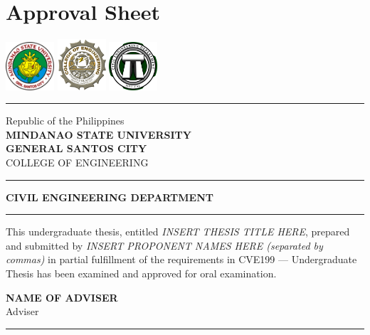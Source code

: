 \chapter*{Approval Sheet}
\thispagestyle{frontmatter}

{
	\vspace*{-1em}
	\begin{center}
		\includegraphics[width=1.8cm]{./assets/logo2.jpg}
		\hspace{1cm}
		\includegraphics[width=1.8cm]{./assets/logo3.jpg}
		\hspace{1cm}
		\includegraphics[width=1.8cm]{./assets/logo.png}
	\end{center}
	\hrule
	\begin{center}
		Republic of the Philippines\\
		{\bfseries MINDANAO STATE UNIVERSITY\\GENERAL SANTOS CITY}\\[0.5em]
		COLLEGE OF ENGINEERING
	\end{center}
	\hrule
	\begin{center}
		\bfseries CIVIL ENGINEERING DEPARTMENT
	\end{center}
	\hrule
	\vspace*{1em}
	This undergraduate thesis, entitled \textsl{INSERT THESIS TITLE HERE}, prepared and submitted by \textsl{INSERT PROPONENT NAMES HERE (separated by commas)} in partial fulfillment of the requirements in CVE199 --- Undergraduate Thesis has been examined and approved for oral examination.
	\vspace*{1cm}

	\hspace{7.5cm}
	\begin{minipage}{6cm}
		\centering
		\textbf{NAME OF ADVISER}\\
		\footnotesize Adviser
	\end{minipage}
	\vspace*{1em}
	\hrule
	\vspace*{1em}

}
